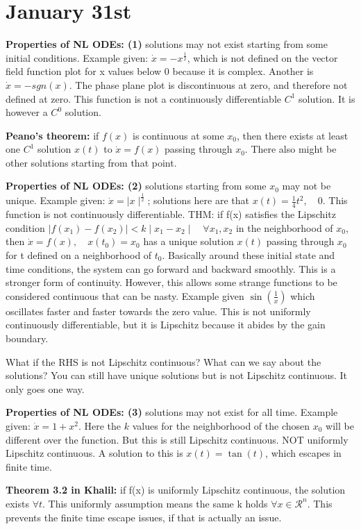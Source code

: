 \documentclass[11pt]{article}
\begin{document}
\section*{January 31st} %
\label{sec:jan31}
\textbf{Properties of NL ODEs: (1)} solutions may not exist starting from some initial conditions. Example given: $\dot{x}=-x^{\frac{1}{2}}$, which is not defined on the vector field function plot for x values below 0 because it is complex. Another is $\dot{x} = -sgn(x)$. The phase plane plot is discontinuous at zero, and therefore not defined at zero. This function is not a continuously differentiable $C^1$ solution. It is however a $C^0$ solution. 

\textbf{Peano's theorem:} if $f(x)$ is continuous at some $x_0$, then there exists at least one $C^1$ solution $x(t)$ to $\dot{x}=f(x)$ passing through $x_0$. There also might be other solutions starting from that point.

\textbf{Properties of NL ODEs: (2)} solutions starting from some $x_0$ may not be unique. Example given: $\dot{x} = \mid x \mid^{\frac{1}{2}}$; solutions here are that $x(t) = \frac{1}{4}t^2,\quad 0$. This function is not continuously differentiable.  THM: if f(x) satisfies the Lipschitz condition $\mid f(x_1) - f(x_2)\mid < k\mid x_1 - x_2 \mid \quad \forall x_1,x_2$
in the neighborhood of $x_0$, then $\dot{x} = f(x), \quad x(t_0) = x_0$ has a unique solution $x(t)$ passing through $x_0$ for t defined on a neighborhood of $t_0$. Basically around these initial state and time conditions, the system can go forward and backward smoothly. This is a stronger form of continuity. However, this allows some strange functions to be considered continuous that can be nasty. Example given $\sin(\frac{1}{x})$ which oscillates faster and faster towards the zero value. This is not uniformly continuously differentiable, but it is Lipschitz because it abides by the gain boundary.

What if the RHS is not Lipschitz continuous? What can we say about the solutions? You can still have unique solutions but is not Lipschitz continuous. It only goes  one way.

\textbf{Properties of NL ODEs: (3)} solutions may not exist for all time. Example given: $\dot{x} = 1+x^2$. Here the $k$ values for the neighborhood of the chosen $x_0$ will be different over the function. But this is still Lipschitz continuous. NOT uniformly Lipschitz continuous. A solution to this is $x(t)=\tan(t)$, which escapes in finite time. 

\textbf{Theorem 3.2 in Khalil:} if f(x) is uniformly Lipschitz continuous, the solution exists $\forall t$. This uniformly assumption means the same k holds $\forall x \in \mathcal{R}^n$. This prevents the finite time escape issues, if that is actually an issue.
\end{document}
